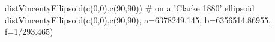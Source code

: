\begin{SeeAlso}\relax
{}
\end{SeeAlso}
\begin{Examples}
\begin{ExampleCode}
distVincentyEllipsoid(c(0,0),c(90,90))
# on a 'Clarke 1880' ellipsoid
distVincentyEllipsoid(c(0,0),c(90,90), a=6378249.145, b=6356514.86955, f=1/293.465)
\end{ExampleCode}
\end{Examples}

